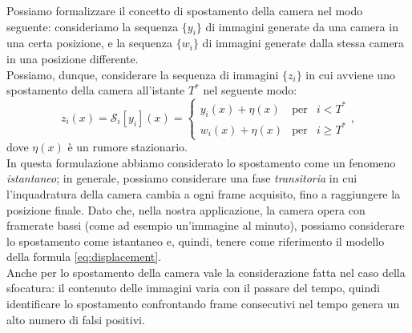 Possiamo formalizzare il concetto di spostamento della camera nel modo seguente: consideriamo la sequenza $\{y_i\}$ di immagini generate da una camera in una certa posizione, e la sequenza $\{w_i\}$ di immagini generate dalla stessa camera in una posizione differente.\\
Possiamo, dunque, considerare la sequenza di immagini $\{z_i\}$ in cui avviene uno spostamento della camera all'istante $T^*$ nel seguente modo:
\begin{equation}
\label{eq:displacement}
z_i(x) = \mathcal{S}_i[y_i](x) = \left\{ \begin{array}{rcl}
	y_i(x) + \eta(x) & \mbox{per} & i < T^* \\
	w_i(x) + \eta(x) & \mbox{per} & i \geqslant T^*
	\end{array}\right. ,
\end{equation}
dove $\eta(x)$ \`e un rumore stazionario.\\
In questa formulazione abbiamo considerato lo spostamento come un fenomeno \textit{istantaneo};
in generale, possiamo considerare una fase \textit{transitoria} in cui l'inquadratura della camera cambia a ogni \gls{frame} acquisito, fino a raggiungere la posizione finale. 
Dato che, nella nostra applicazione, la camera opera con \gls{framerate} bassi (come ad esempio un'immagine al minuto), possiamo considerare lo spostamento come istantaneo e, quindi, tenere come riferimento il modello della formula \ref{eq:displacement}.\\
Anche per lo spostamento della camera vale la considerazione fatta nel caso della sfocatura: il contenuto delle immagini varia con il passare del tempo, quindi identificare lo spostamento confrontando frame consecutivi nel tempo genera un alto numero di falsi positivi.
